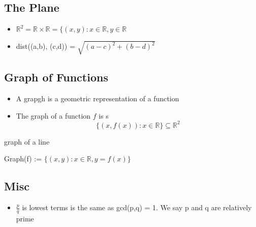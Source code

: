 \documentclass{report}
\begin{document}
  \subsection{The Plane}%
    \begin{itemize}
      \item $\mathbb{R}^2 = \mathbb{R} \times \mathbb{R} = 
        \{(x,y): x \in \mathbb{R}, y \in \mathbb{R}$
        \item dist((a,b), (c,d)) = $\sqrt{(a-c)^2 + (b-d)^2}$
    \end{itemize}

  \subsection{Graph of Functions}%
    \begin{itemize}
      \item A grapgh is a geometric representation of a function
      \item The graph of a function $f$ is
        s\[ \{(x, f(x)): x \in \mathbb{R}\} \subseteq \mathbb{R}^2 \]
    \end{itemize}
     {
       graph of a line
    }
  \item Graph(f) := $\{ (x,y): x \in \mathbb{R}, y = f(x) \}$

    \subsection{Misc}%
    \begin{itemize}
      \item $\frac{p}{q} $ is lowest terms is the same as gcd(p,q) = 1.
        We say p and q are relatively prime
    \end{itemize}
  
    
\end{document}
